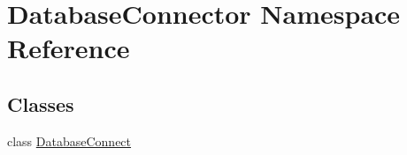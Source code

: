 \hypertarget{namespaceDatabaseConnector}{}\section{Database\+Connector Namespace Reference}
\label{namespaceDatabaseConnector}
\subsection*{Classes}
\begin{DoxyCompactItemize}
\item 
class \mbox{\hyperlink{classDatabaseConnector_1_1DatabaseConnect}{Database\+Connect}}
\end{DoxyCompactItemize}
